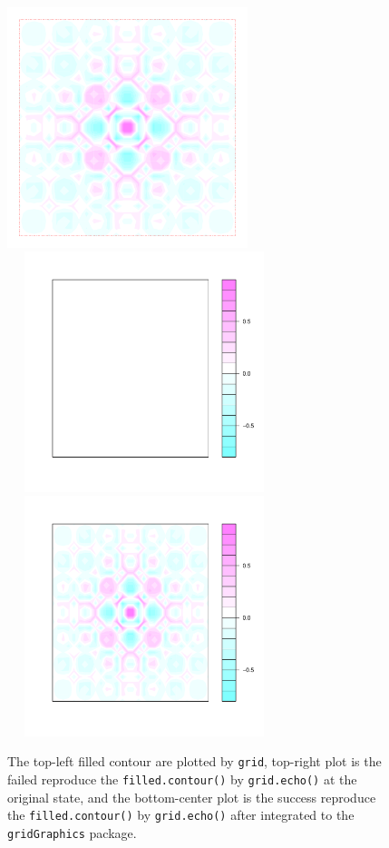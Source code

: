 \documentclass[paper=a4, fontsize=11pt]{report}
\begin{document}
\begin{figure}[h]
\begin{center}
  \includegraphics[height = 7cm, width = 7cm]{figure/filledContour_origin_02.pdf}
  \includegraphics[height = 7cm, width = 8cm]{figure/filledContour_origin_03.pdf}
  \includegraphics[height = 7cm, width = 8cm]{figure/filledContour_origin_01.pdf}

  \caption{The top-left filled contour are plotted by \texttt{grid}, top-right plot is the failed reproduce the \texttt{filled.contour()} by \texttt{grid.echo()} at the original state, and the bottom-center plot is the success reproduce the \texttt{filled.contour()} by \texttt{grid.echo()} after integrated to the \texttt{gridGraphics} package.}
  	\label{figure_4.6}
\end{center}
\end{figure}
\end{document}

